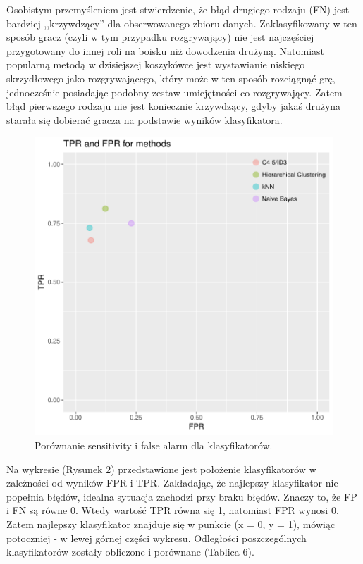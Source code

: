 \documentclass[twoside,twocolumn]{article}
\begin{document}
\indent Osobistym przemyśleniem jest stwierdzenie, że błąd drugiego rodzaju (FN) jest bardziej ,,krzywdzący'' dla obserwowanego zbioru danych. Zaklasyfikowany w ten sposób gracz (czyli w tym przypadku rozgrywający) nie jest najczęściej przygotowany do innej roli na boisku niż dowodzenia drużyną. Natomiast popularną metodą w dzisiejszej koszykówce jest wystawianie niskiego skrzydłowego jako rozgrywającego, który może w ten sposób rozciągnąć grę, jednocześnie posiadając podobny zestaw umiejętności co rozgrywający. Zatem błąd pierwszego rodzaju nie jest koniecznie krzywdzący, gdyby jakaś drużyna starała się dobierać gracza na podstawie wyników klasyfikatora.

\begin{figure}[hbt!]
  \centering
    \includegraphics[width=\linewidth]{plot_ROCspace.pdf}
  \caption{Porównanie sensitivity i false alarm dla klasyfikatorów.}
  \label{fig:coffee}
\end{figure}

\indent Na wykresie (Rysunek 2) przedstawione jest położenie klasyfikatorów w zależności od wyników FPR i TPR. Zakładając, że najlepszy klasyfikator nie popełnia błędów, idealna sytuacja zachodzi przy braku błędów. Znaczy to, że FP i FN są równe 0. Wtedy wartość TPR równa się 1, natomiast FPR wynosi 0. Zatem najlepszy klasyfikator znajduje się w punkcie (x = 0, y = 1), mówiąc potoczniej - w lewej górnej części wykresu. Odległości poszczególnych klasyfikatorów zostały obliczone i porównane (Tablica 6).
\end{document}
